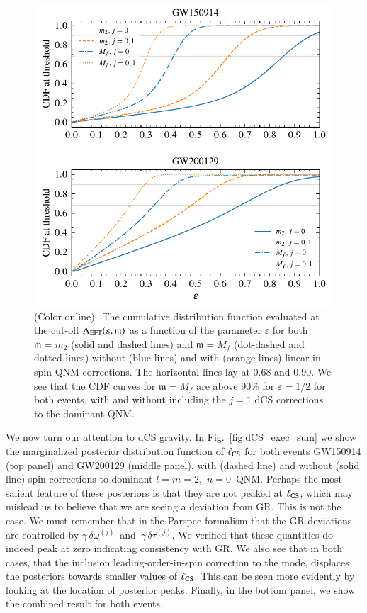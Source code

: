 \documentclass[twocolumn,prd,aps,superscriptaddress,preprintnumbers,tightenlines,showpacs,nofootinbib,amsfonts,amsmath,longbibliography]{revtex4-1}
\newcommand{\gm}{\mathfrak{m}}
\begin{document}
\begin{figure}[t]
\includegraphics[width=\columnwidth]{figs/dcs_cdf_varying_threshold.pdf}
\caption{(Color online).~The cumulative distribution function evaluated at the
cut-off $\Lambda_{\rm EFT}(\varepsilon, \gm)$ as a function of the parameter $\varepsilon$ for both
$\gm = m_2$ (solid and dashed lines) and $\gm = M_{f}$ (dot-dashed and dotted lines) without
(blue lines) and with (orange lines) linear-in-spin QNM corrections.
The horizontal lines lay at 0.68 and 0.90.
%
We see that the CDF curves for $\gm = M_{f}$ are above 90\% for $\varepsilon =
1/2$ for both events, with and without including the $j = 1$ dCS corrections to
the dominant QNM.
}
\label{fig:dcs_cdf}
\end{figure}


We now turn our attention to dCS gravity.
%
In Fig.~\ref{fig:dCS_exec_sum} we show the marginalized posterior distribution
function of $\ell_{\rm CS}$ for both events GW150914 (top panel) and GW200129
(middle panel), with (dashed line) and without (solid line) spin corrections to
dominant $l = m = 2$,~$n=0$~QNM.
%
Perhaps the most salient feature of these posteriors is that they are not
peaked at $\ell_{\rm CS}$, which may mislead us to believe that we are seeing a
deviation from GR. This is not the case.
%
We must remember that in the {\sc Parspec} formalism that the GR deviations
are controlled by $\gamma \, \delta \omega^{(j)}$~and~$\gamma \, \delta \tau^{(j)}$.
We verified that these quantities do indeed peak at zero indicating consistency with GR.
%
We also see that in both cases, that the inclusion leading-order-in-spin
correction to the mode, displaces the posteriors towards smaller values of
$\ell_{\rm CS}$. This can be seen more evidently by looking at the location of
posterior peaks.
%
Finally, in the bottom panel, we show the combined result for both events.
\end{document}
